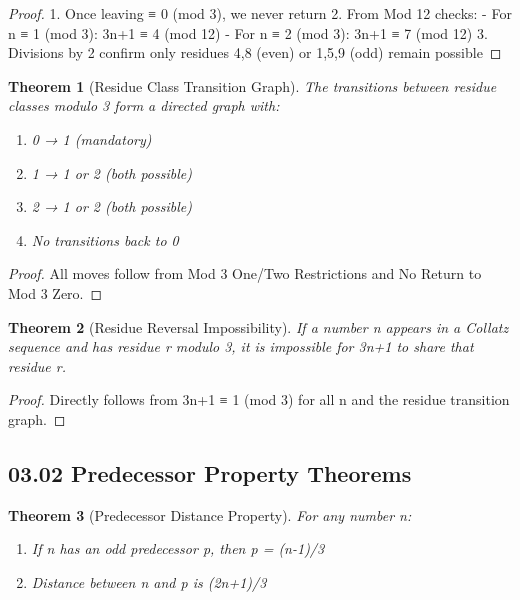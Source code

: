 \documentclass[11pt]{article}
\newtheorem{theorem}{Theorem}[section]
\begin{document}
\begin{proof}
1. Once leaving ≡ 0 (mod 3), we never return
2. From Mod 12 checks:
   - For n ≡ 1 (mod 3): 3n+1 ≡ 4 (mod 12)
   - For n ≡ 2 (mod 3): 3n+1 ≡ 7 (mod 12)
3. Divisions by 2 confirm only residues 4,8 (even) or 1,5,9 (odd) remain possible
\end{proof}

\begin{theorem}[Residue Class Transition Graph]\label{thm:res_graph}
The transitions between residue classes modulo 3 form a directed graph with:
\begin{enumerate}
    \item 0 → 1 (mandatory)
    \item 1 → 1 or 2 (both possible)
    \item 2 → 1 or 2 (both possible)
    \item No transitions back to 0
\end{enumerate}
\end{theorem}

\begin{proof}
All moves follow from Mod 3 One/Two Restrictions and No Return to Mod 3 Zero.
\end{proof}

\begin{theorem}[Residue Reversal Impossibility]\label{thm:res_rev}
If a number n appears in a Collatz sequence and has residue r modulo 3, it is impossible for 3n+1 to share that residue r.
\end{theorem}

\begin{proof}
Directly follows from 3n+1 ≡ 1 (mod 3) for all n and the residue transition graph.
\end{proof}

\subsection*{03.02 Predecessor Property Theorems}

\begin{theorem}[Predecessor Distance Property]\label{thm:pred_dist}
For any number n:
\begin{enumerate}
    \item If n has an odd predecessor p, then p = (n-1)/3
    \item Distance between n and p is (2n+1)/3
\end{enumerate}
\end{theorem}
\end{document}
